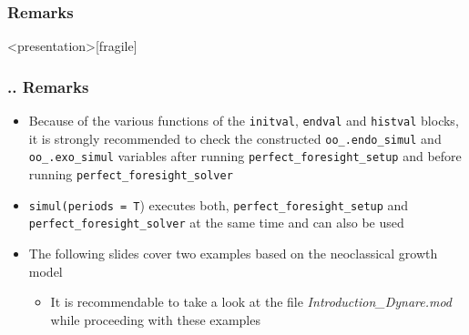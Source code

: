 \documentclass[11pt,aspectratio=169]{beamer}
\begin{document}
\subsubsection{Remarks}
\begin{frame}<presentation>[fragile]
	\frametitle{{\thesection.\thesubsection.\thesubsubsection} Remarks}
	\begin{itemize}
		\item Because of the various functions of the \texttt{initval}, \texttt{endval} and \texttt{histval} blocks, it is strongly recommended to check the constructed \texttt{oo\_.endo\_simul} and \texttt{oo\_.exo\_simul} variables after running \texttt{perfect\_foresight\_setup} and before running \texttt{perfect\_foresight\_solver} 
		\item \texttt{simul(periods = T}) executes both,  \texttt{perfect\_foresight\_setup} and \linebreak \texttt{perfect\_foresight\_solver} at the same time and can also be used
		\item The following slides cover two examples based on the neoclassical growth model 
		\begin{itemize}
			\item It is recommendable to take a look at the file \textit{Introduction\_Dynare.mod} while proceeding with these examples
		\end{itemize}
	\end{itemize}
\end{frame}
\end{document}
